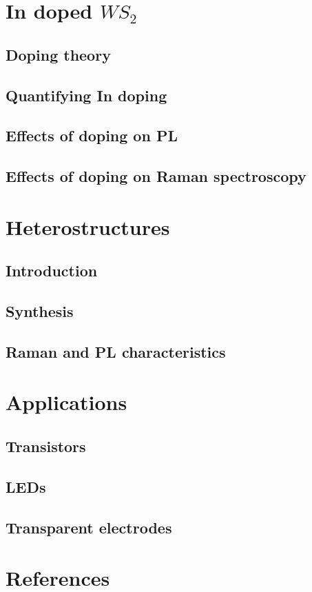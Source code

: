 \documentclass[12pt]{article}
\begin{document}
\section{In doped $WS_2$}
	\subsection{Doping theory}
	\subsection{Quantifying In doping}
	\subsection{Effects of doping on PL}
	\subsection{Effects of doping on Raman spectroscopy}
\section{Heterostructures}
	\subsection{Introduction}
	\subsection{Synthesis}
	\subsection{Raman and PL characteristics}
\section{Applications}
	\subsection{Transistors}
	\subsection{LEDs}
	\subsection{Transparent electrodes}
	
\section*{References}
\end{document}
